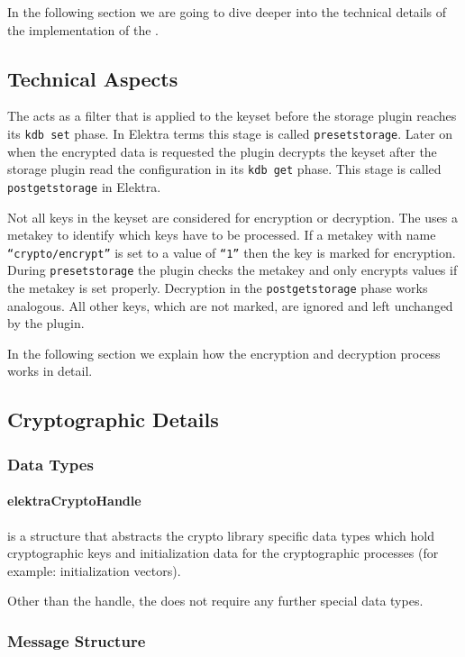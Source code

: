 In the following section we are going to dive deeper into the technical
details of the implementation of the \crypto.

\subsection{Technical Aspects}

The \crypto{} acts as a filter that is applied to the keyset before the storage plugin reaches its \texttt{kdb set} phase.
In Elektra terms this stage is called \texttt{presetstorage}.
Later on when the encrypted data is requested the plugin decrypts the keyset after the storage plugin read the configuration in its \texttt{kdb get} phase.
This stage is called \texttt{postgetstorage} in Elektra.

Not all keys in the keyset are considered for encryption or decryption.
The \crypto{} uses a metakey to identify which keys have to be processed.
If a metakey with name \texttt{``crypto/encrypt''} is set to a value of \texttt{``1''} then the key is marked for encryption.
During \texttt{presetstorage} the plugin checks the metakey and only encrypts values if the metakey is set properly.
Decryption in the \texttt{postgetstorage} phase works analogous.
All other keys, which are not marked, are ignored and left unchanged by the plugin.

In the following section we explain how the encryption and decryption process works in detail.

\subsection{Cryptographic Details}

\subsubsection{Data Types}

\paragraph{elektraCryptoHandle} is a structure that  abstracts the crypto
library specific data types which hold cryptographic keys and initialization
data for the cryptographic processes (for example: initialization vectors).

Other than the handle, the \crypto{} does not require any further
special data types.

\subsubsection{Message Structure}

